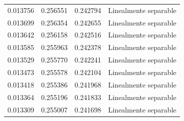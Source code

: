\begin{tabular}{llll}
0.013756 & 0.256551 & 0.242794 & Linealmente separable \\
0.013699 & 0.256354 & 0.242655 & Linealmente separable \\
0.013642 & 0.256158 & 0.242516 & Linealmente separable \\
0.013585 & 0.255963 & 0.242378 & Linealmente separable \\
0.013529 & 0.255770 & 0.242241 & Linealmente separable \\
0.013473 & 0.255578 & 0.242104 & Linealmente separable \\
0.013418 & 0.255386 & 0.241968 & Linealmente separable \\
0.013364 & 0.255196 & 0.241833 & Linealmente separable \\
0.013309 & 0.255007 & 0.241698 & Linealmente separable \\
\bottomrule
\end{tabular}
